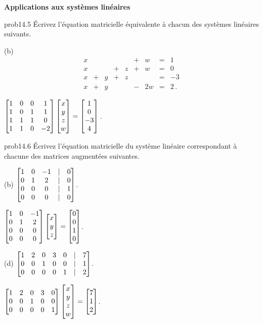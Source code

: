 \bigskip
\centerline{\bf  {Applications aux systèmes linéaires}} 
\begin{sol}{prob14.5}
\'Ecrivez l'équation matricielle équivalente à chacun des systèmes linéaires suivants.
\medskip

(b) $$\begin{matrix} x&&&&&+&w&=&1\\
x&&&+&z&+&w&=&0\\
x&+&y&+&z&&&=&-3\\
x&+&y&&&-&2w&=&2\,. \end{matrix} $$

\soln $\bmatrix 
1 & 0 & 0 & 1 \\
 1 & 0 & 1 & 1 \\
 1 & 1 & 1 & 0 \\
 1 & 1 & 0 & -2 \endbmatrix  \bmatrix x\\y\\ z\\w\endbmatrix = \bmatrix 1\\0\\ -3\\4\endbmatrix  $\,.
\medskip

 

\end{sol}

\bigskip
\begin{sol}{prob14.6}  Écrivez l'équation matricielle du système linéaire correspondant à chacune des matrices augmentées suivantes.
\medskip

(b) $ \bmatrix 1 & 0 & -1 &|&0 \\
 0 & 1 & 2 &|&0\\
 0 & 0 & 0&|&1 \\
 0 & 0 & 0 &|&0\endbmatrix$.

\soln $ \bmatrix 
1 & 0 & -1\\
0 & 1 & 2\\
0 & 0 & 0\\
0 & 0 & 0 \endbmatrix \bmatrix x\\y\\ z\endbmatrix=
\bmatrix 0\\0\\ 1\\0\endbmatrix$.
\medskip
 

(d) $\bmatrix  
1 & 2 & 0 & 3 & 0 &|& 7 \\
0 & 0 & 1 & 0 & 0 &|& 1 \\
0 & 0 & 0 & 0 & 1 &|& 2 \endbmatrix$.

\soln  $\bmatrix  
1 & 2 & 0 & 3 & 0   \\
0 & 0 & 1 & 0 & 0  \\
0 & 0 & 0 & 0 & 1  \endbmatrix
\bmatrix x\\y\\ z\\w\endbmatrix =\bmatrix 7\\1\\ 2\endbmatrix $.

\medskip

\end{sol}


